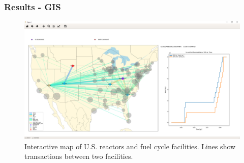 \begin{frame}
    \frametitle{Results - GIS}
    \begin{figure}[htbp!]
        \begin{center}
                \includegraphics[width=.8\textwidth]{./images/sim_output/us/map.png}
        \end{center}
    \caption{Interactive map of U.S. reactors and fuel cycle
     facilities. Lines show transactions between two facilities.}
    \end{figure}
\end{frame}


